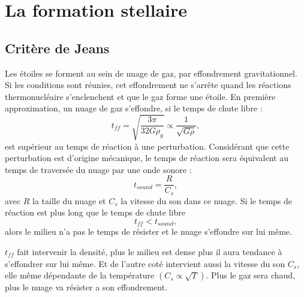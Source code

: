 


\section{La formation stellaire}

\subsection{Critère de Jeans}


Les étoiles se forment au sein de nuage de gaz, par effondrement gravitationnel.
Si les conditions sont réunies, cet effondrement ne s'arrête quand les réactions thermonucléaire s'enclenchent et que le gaz forme une étoile.
En première approximation, un nuage de gaz s'effondre, si le temps de chute libre : 
\begin{equation}
t_{ff} =  \sqrt{\frac{3\pi}{32G\rho_g}} \propto \frac{1}{\sqrt{G \rho}},
\label{eq:tff}
\end{equation}
est supérieur au temps de réaction à une perturbation.
Considérant que cette perturbation est d'origine mécanique, le temps de réaction sera équivalent au temps de traversée du nuage par une onde sonore :
 \begin{equation}
t_{sound} = \frac{R}{C_s},
\end{equation}
avec $R$ la taille du nuage et $C_s$ la vitesse du son dans ce nuage.
Si le temps de réaction est plus long que le temps de chute libre
\begin{equation}
t_{ff} < t_{sound},
\end{equation}
alors le milieu n'a pas le temps de résister et le nuage s'effondre sur lui même.

$t_{ff}$ fait intervenir la densité, plus le milieu est dense plus il aura tendance à s'effondrer sur lui même.
Et de l'autre coté intervient aussi la vitesse du son $C_s$, elle même dépendante de la température $\left( C_s \propto \sqrt{T} \right)$.
Plus le gaz sera chaud, plus le nuage va résister a son effondrement.


